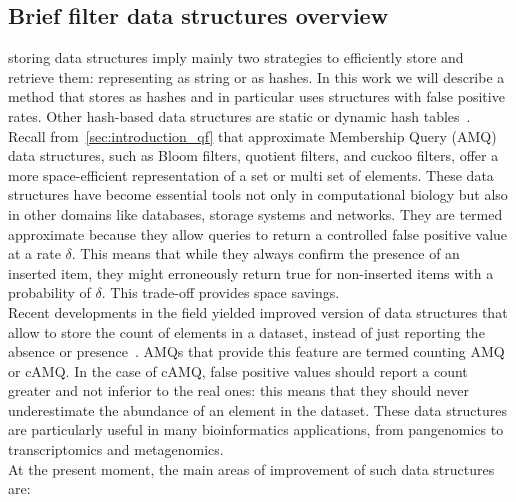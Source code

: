 \subsection{Brief filter data structures overview}
\kmer storing data structures imply mainly two strategies to efficiently store and retrieve them: representing \kmers as string or as hashes\cite{marchet2024kmersets}. In this work we will describe a method that stores \kmers as hashes and in particular uses structures with false positive rates. Other hash-based data structures are static or dynamic hash tables~\cite{sshash}.\\
Recall from~\ref{sec:introduction_qf} that approximate Membership Query (AMQ) data structures, such as Bloom filters, quotient filters, and cuckoo filters, offer a more space-efficient representation of a set or multi set of elements. These data structures have become essential tools not only in computational biology but also in other domains like databases, storage systems and networks. They are termed approximate because they allow queries to return a controlled false positive value at a rate $\delta$. This means that while they always confirm the presence of an inserted item, they might erroneously return true for non-inserted items with a probability of $\delta$. This trade-off provides space savings.\\
Recent developments in the \kmer field yielded improved version of data structures that allow to store the count of elements in a dataset, instead of just reporting the absence or presence~\cite{squeakr,pandey,cqf,comin_count,sshash}. AMQs that provide this feature are termed counting AMQ or \gls{cAMQ}. In the case of cAMQ, false positive values should report a count greater and not inferior to the real ones: this means that they should never underestimate the abundance of an element in the dataset. These data structures are particularly useful in many bioinformatics applications, from pangenomics to transcriptomics and metagenomics.\\
At the present moment, the main areas of improvement of such data structures are:

